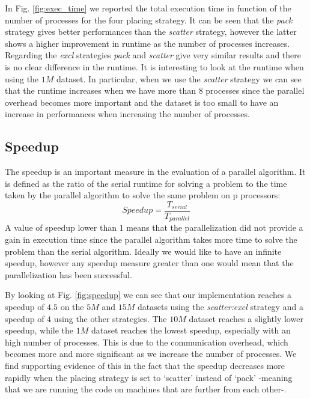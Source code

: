 In Fig. \ref{fig:exec_time} we reported the total execution time in function of the number of processes for the four placing strategy.
It can be seen that the \textit{pack} strategy gives better performances than the \textit{scatter} strategy, however
the latter shows a higher improvement in runtime as the number of processes increases. Regarding the \textit{excl} strategies
\textit{pack} and \textit{scatter} give very similar results and there is no clear difference in the runtime.
It is interesting to look at the runtime when using the $1M$ dataset. In particular, when we use the \textit{scatter} strategy we can
see that the runtime increases when we have more than $8$ processes since the parallel overhead becomes more important and the dataset is too
small to have an increase in performances when increasing the number of processes.

\subsection{Speedup}
The speedup is an important measure in the evaluation of a parallel algorithm.
It is defined as the ratio of the serial runtime for solving a problem to the time taken by the
parallel algorithm to solve the same problem on p processors:
\begin{equation}
  Speedup = \frac{T_{serial}}{T_{parallel}}
\end{equation}
A value of speedup lower than 1 means that the parallelization did not provide a gain in execution time
since the parallel algorithm takes more time to solve the problem than the serial algorithm.
Ideally we would like to have an infinite speedup, however any speedup measure greater than one would
mean that the parallelization has been successful.

By looking at Fig. \ref{fig:speedup} we can see that our implementation reaches a speedup of $4.5$ on the
$5M$ and $15M$ datasets using the \textit{scatter:excl} strategy and a speedup of $4$ using the other strategies.
The $10M$ dataset reaches a slightly lower speedup, while the $1M$ dataset reaches the lowest speedup, especially
with an high number of processes. This is due to the communication overhead, which becomes more and more significant as we increase the number of processes. We find supporting evidence of this in the fact that the speedup decreases more rapidly when the placing strategy is set to `scatter' instead of `pack' -meaning that we are running the code on machines that are further from each other-.


